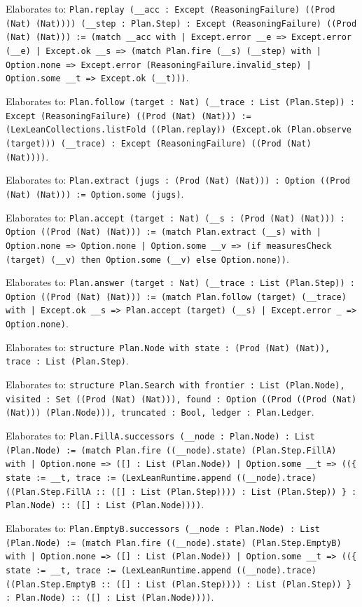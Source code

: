 \documentclass[11pt]{article}
\begin{document}
\noindent Elaborates to: \texttt{Plan.replay (\_\_acc : Except (ReasoningFailure) ((Prod (Nat) (Nat)))) (\_\_step : Plan.Step) : Except (ReasoningFailure) ((Prod (Nat) (Nat))) := (match \_\_acc with | Except.error \_\_e => Except.error (\_\_e) | Except.ok \_\_s => (match Plan.fire (\_\_s) (\_\_step) with | Option.none => Except.error (ReasoningFailure.invalid\_step) | Option.some \_\_t => Except.ok (\_\_t)))}.\par
\noindent Elaborates to: \texttt{Plan.follow (target : Nat) (\_\_trace : List (Plan.Step)) : Except (ReasoningFailure) ((Prod (Nat) (Nat))) := (LexLeanCollections.listFold ((Plan.replay)) (Except.ok (Plan.observe (target))) (\_\_trace) : Except (ReasoningFailure) ((Prod (Nat) (Nat))))}.\par
\noindent Elaborates to: \texttt{Plan.extract (jugs : (Prod (Nat) (Nat))) : Option ((Prod (Nat) (Nat))) := Option.some (jugs)}.\par
\noindent Elaborates to: \texttt{Plan.accept (target : Nat) (\_\_s : (Prod (Nat) (Nat))) : Option ((Prod (Nat) (Nat))) := (match Plan.extract (\_\_s) with | Option.none => Option.none | Option.some \_\_v => (if measuresCheck (target) (\_\_v) then Option.some (\_\_v) else Option.none))}.\par
\noindent Elaborates to: \texttt{Plan.answer (target : Nat) (\_\_trace : List (Plan.Step)) : Option ((Prod (Nat) (Nat))) := (match Plan.follow (target) (\_\_trace) with | Except.ok \_\_s => Plan.accept (target) (\_\_s) | Except.error \_ => Option.none)}.\par
\noindent Elaborates to: \texttt{structure Plan.Node with state : (Prod (Nat) (Nat)), trace : List (Plan.Step)}.\par
\noindent Elaborates to: \texttt{structure Plan.Search with frontier : List (Plan.Node), visited : Set ((Prod (Nat) (Nat))), found : Option ((Prod ((Prod (Nat) (Nat))) (Plan.Node))), truncated : Bool, ledger : Plan.Ledger}.\par
\noindent Elaborates to: \texttt{Plan.FillA.successors (\_\_node : Plan.Node) : List (Plan.Node) := (match Plan.fire ((\_\_node).state) (Plan.Step.FillA) with | Option.none => ([] : List (Plan.Node)) | Option.some \_\_t => ((\{ state := \_\_t, trace := (LexLeanRuntime.append ((\_\_node).trace) ((Plan.Step.FillA :: ([] : List (Plan.Step)))) : List (Plan.Step)) \} : Plan.Node) :: ([] : List (Plan.Node))))}.\par
\noindent Elaborates to: \texttt{Plan.EmptyB.successors (\_\_node : Plan.Node) : List (Plan.Node) := (match Plan.fire ((\_\_node).state) (Plan.Step.EmptyB) with | Option.none => ([] : List (Plan.Node)) | Option.some \_\_t => ((\{ state := \_\_t, trace := (LexLeanRuntime.append ((\_\_node).trace) ((Plan.Step.EmptyB :: ([] : List (Plan.Step)))) : List (Plan.Step)) \} : Plan.Node) :: ([] : List (Plan.Node))))}.\par
\end{document}
